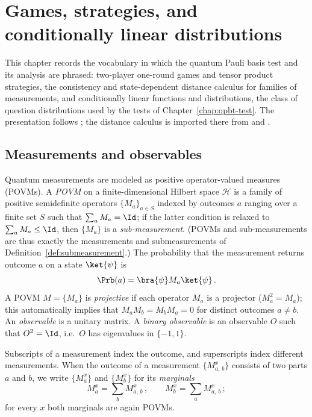 \chapter{Games, strategies, and conditionally linear distributions}
\label{chap:qpbt-games}
\label{sec:games}

This chapter records the vocabulary in which the quantum Pauli basis test and its analysis are phrased: two-player one-round games and tensor product strategies, the consistency and state-dependent distance calculus for families of measurements, and conditionally linear functions and distributions, the class of question distributions used by the tests of Chapter~\ref{chap:qpbt-test}. The presentation follows \cite{Ji2020MIPStar}; the distance calculus is imported there from \cite{Natarajan2018NEEXP} and \cite{Ji2020LowIndividualDegree}.

\section{Measurements and observables}

\begin{definition}\label{def:povm-conventions}
	Quantum measurements are modeled as positive operator-valued measures (POVMs). A \emph{POVM} on a finite-dimensional Hilbert space $\mathcal H$ is a family of positive semidefinite operators $\{M_a\}_{a \in S}$ indexed by outcomes $a$ ranging over a finite set $S$ such that $\sum_a M_a = \Id$; if the latter condition is relaxed to $\sum_a M_a \le \Id$, then $\{M_a\}$ is a \emph{sub-measurement}. (POVMs and sub-measurements are thus exactly the measurements and submeasurements of Definition~\ref{def:submeasurement}.) The probability that the measurement returns outcome $a$ on a state $\ket{\psi}$ is
	\[
		\Prb(a) = \bra{\psi} M_a \ket{\psi}\,.
	\]
	A POVM $M = \{M_a\}$ is \emph{projective} if each operator $M_a$ is a projector ($M_a^2 = M_a$); this automatically implies that $M_a M_b = M_b M_a = 0$ for distinct outcomes $a \ne b$. An \emph{observable} is a unitary matrix. A \emph{binary observable} is an observable $O$ such that $O^2 = \Id$, i.e.\ $O$ has eigenvalues in $\{-1,1\}$.

	Subscripts of a measurement index the outcome, and superscripts index different measurements. When the outcome of a measurement $\{M^x_{a,\,b}\}$ consists of two parts $a$ and $b$, we write $\{M^x_a\}$ and $\{M^x_b\}$ for its \emph{marginals}
	\[
		M^x_a = \sum_b M^x_{a,\,b}\,, \qquad M^x_b = \sum_a M^x_{a,\,b}\,;
	\]
	for every $x$ both marginals are again POVMs.
\end{definition}

